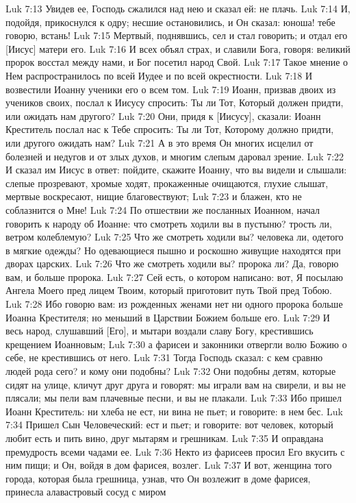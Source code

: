 Luk 7:13  Увидев ее, Господь сжалился над нею и сказал ей: не плачь.
Luk 7:14  И, подойдя, прикоснулся к одру; несшие остановились, и Он сказал: юноша! тебе говорю, встань!
Luk 7:15  Мертвый, поднявшись, сел и стал говорить; и отдал его [Иисус] матери его.
Luk 7:16  И всех объял страх, и славили Бога, говоря: великий пророк восстал между нами, и Бог посетил народ Свой.
Luk 7:17  Такое мнение о Нем распространилось по всей Иудее и по всей окрестности.
Luk 7:18  И возвестили Иоанну ученики его о всем том.
Luk 7:19  Иоанн, призвав двоих из учеников своих, послал к Иисусу спросить: Ты ли Тот, Который должен придти, или ожидать нам другого?
Luk 7:20  Они, придя к [Иисусу], сказали: Иоанн Креститель послал нас к Тебе спросить: Ты ли Тот, Которому должно придти, или другого ожидать нам?
Luk 7:21  А в это время Он многих исцелил от болезней и недугов и от злых духов, и многим слепым даровал зрение.
Luk 7:22  И сказал им Иисус в ответ: пойдите, скажите Иоанну, что вы видели и слышали: слепые прозревают, хромые ходят, прокаженные очищаются, глухие слышат, мертвые воскресают, нищие благовествуют;
Luk 7:23  и блажен, кто не соблазнится о Мне!
Luk 7:24  По отшествии же посланных Иоанном, начал говорить к народу об Иоанне: что смотреть ходили вы в пустыню? трость ли, ветром колеблемую?
Luk 7:25  Что же смотреть ходили вы? человека ли, одетого в мягкие одежды? Но одевающиеся пышно и роскошно живущие находятся при дворах царских.
Luk 7:26  Что же смотреть ходили вы? пророка ли? Да, говорю вам, и больше пророка.
Luk 7:27  Сей есть, о котором написано: вот, Я посылаю Ангела Моего пред лицем Твоим, который приготовит путь Твой пред Тобою.
Luk 7:28  Ибо говорю вам: из рожденных женами нет ни одного пророка больше Иоанна Крестителя; но меньший в Царствии Божием больше его.
Luk 7:29  И весь народ, слушавший [Его], и мытари воздали славу Богу, крестившись крещением Иоанновым;
Luk 7:30  а фарисеи и законники отвергли волю Божию о себе, не крестившись от него.
Luk 7:31  Тогда Господь сказал: с кем сравню людей рода сего? и кому они подобны?
Luk 7:32  Они подобны детям, которые сидят на улице, кличут друг друга и говорят: мы играли вам на свирели, и вы не плясали; мы пели вам плачевные песни, и вы не плакали.
Luk 7:33  Ибо пришел Иоанн Креститель: ни хлеба не ест, ни вина не пьет; и говорите: в нем бес.
Luk 7:34  Пришел Сын Человеческий: ест и пьет; и говорите: вот человек, который любит есть и пить вино, друг мытарям и грешникам.
Luk 7:35  И оправдана премудрость всеми чадами ее.
Luk 7:36  Некто из фарисеев просил Его вкусить с ним пищи; и Он, войдя в дом фарисея, возлег.
Luk 7:37  И вот, женщина того города, которая была грешница, узнав, что Он возлежит в доме фарисея, принесла алавастровый сосуд с миром
